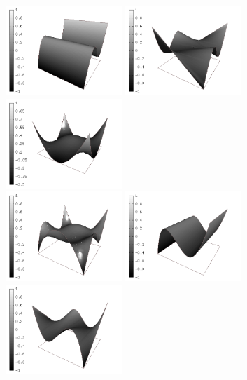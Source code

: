 \begin{figure}[H]
\begin{center}
\includegraphics[width=4.4cm]{minor_examples/BasisFunctions004}
\includegraphics[width=4.4cm]{minor_examples/BasisFunctions008}
\includegraphics[width=4.4cm]{minor_examples/BasisFunctions011}
\\
\includegraphics[width=4.4cm]{minor_examples/BasisFunctions012}
\includegraphics[width=4.4cm]{minor_examples/BasisFunctions013}
\includegraphics[width=4.4cm]{minor_examples/BasisFunctions014}

\end{center}
\end{figure}
